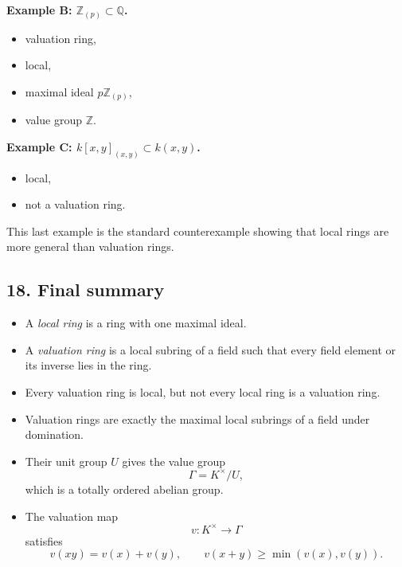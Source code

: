 \documentclass[12pt,a4paper]{article}
\theoremstyle{notespace}
\begin{document}
\textbf{Example B: \(\mathbb Z_{(p)}\subset \mathbb Q\).}
\begin{itemize}
	\item valuation ring,
	\item local,
	\item maximal ideal \(p\mathbb Z_{(p)}\),
	\item value group \(\mathbb Z\).
\end{itemize}

\textbf{Example C: \(k[x,y]_{(x,y)}\subset k(x,y)\).}
\begin{itemize}
	\item local,
	\item not a valuation ring.
\end{itemize}

This last example is the standard counterexample showing that local rings are more general than valuation rings.

\subsection{18. Final summary}

\begin{itemize}
	\item A \emph{local ring} is a ring with one maximal ideal.
	\item A \emph{valuation ring} is a local subring of a field such that every field element or its inverse lies in the ring.
	\item Every valuation ring is local, but not every local ring is a valuation ring.
	\item Valuation rings are exactly the maximal local subrings of a field under domination.
	\item Their unit group \(U\) gives the value group
	\[
	\Gamma = K^\times/U,
	\]
	which is a totally ordered abelian group.
	\item The valuation map
	\[
	v:K^\times\to \Gamma
	\]
	satisfies
	\[
	v(xy)=v(x)+v(y),
	\qquad
	v(x+y)\ge \min(v(x),v(y)).
	\]
\end{itemize}
	
\end{document}
